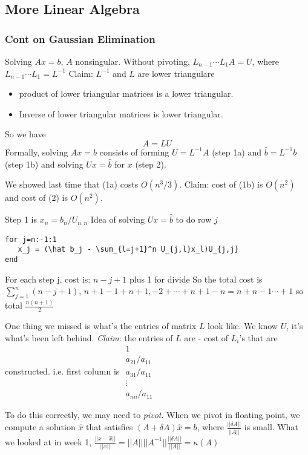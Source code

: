 \subsection{More Linear Algebra}
\label{sec:linearAlgebra}
\subsubsection{Cont on Gaussian Elimination}
Solving $Ax=b$, $A$ nonsingular. Without pivoting, $L_{n-1}\cdots L_1A
= U$, where $L_{n-1}\cdots L_1 = L^{-1}$ Claim: $L^{-1}$ and $L$ are
lower triangulare
\begin{itemize}
\item product of lower triangular matrices is a lower triangular. 
\item Inverse of lower triangular matrices is lower triangular.
\end{itemize}
So we have $$A = LU$$
Formally, solving $Ax=b$ consists of forming $U=L^{-1}A$ (step 1a) and $\hat b = L^{-1}b$
(step 1b) and solving $Ux=\hat b$ for $x$ (step 2).

We showed last time that (1a) costs $O(n^3/3)$. Claim: cost of (1b) is
$O(n^2)$ and cost of (2) is $O(n^2)$.

Step 1 is $x_n=b_n/U_{n,n}$
Idea of solving $Ux=\hat b$ to do row $j$
\begin{verbatim}
for j=n:-1:1
   x_j = (\hat b_j - \sum_{l=j+1}^n U_{j,l}x_l)U_{j,j}
end
\end{verbatim}
For each step j, cost is:  $n-j + 1$ plus 1 for divide
So the total cost is $\sum_{j=1}^n(n-j+1)$, $n+1 - 1+n+1, -2+\cdots +
n+1-n = n+n-1 \cdots +1 $ so total $\frac{n(n+1)}{2}$

One thing we missed is what's the entries of matrix $L$ look like. We
know $U$, it's what's been left behind. \emph{Claim}: the entries of
$L$ are - cost of $L_i$'s that are constructed. i.e. first column is
$\begin{smallmatrix}
1\\ a_{21}/a_{11}\\a_{31}/a_{11}\\ \vdots \\ a_{nn}/a_{11}
\end{smallmatrix}$

To do this correctly, we may need to \emph{pivot}. When we pivot in
floating point, we compute a solution $\hat x$ that satisfies
$(A+\delta A)\hat x=b$, where $\frac{||\delta A||}{||A||}$ is
small. What we looked at in week 1, $\frac{||x-\hat x||}{||x||} =
||A||||A^{-1}||\frac{||\delta A||}{||A||} = \kappa(A)$

